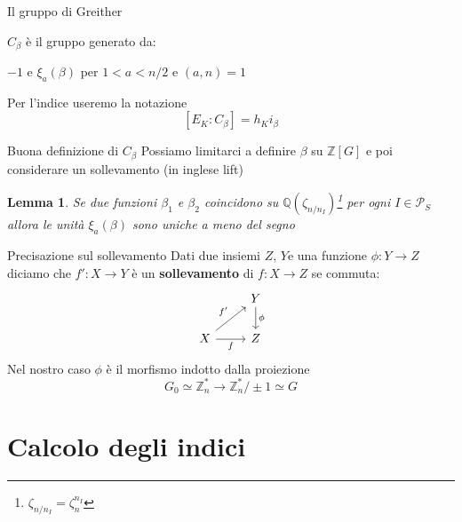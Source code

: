 \documentclass{beamer}
\theoremstyle{plain}
\newtheorem{lem}[teo]{Lemma}
\theoremstyle{remark}
\theoremstyle{definition}
\newcommand{\PS}{\mathcal{P}_S}
\newcommand{\Z}{\mathbb{Z}}
\newcommand{\Q}{\mathbb{Q}}
\begin{document}
	\begin{frame}{Il gruppo di Greither}
		\begin{alertblock}{}
		 		$C_\beta $ è il gruppo generato da:
		 		\begin{center}
		 		
		 		 $ {-1} $ e $ \xi_a (\beta) $ per $ 1< a< n/2 $ e $ (a,n)=1 $
		 		\end{center}
	 	\end{alertblock}
	 	\pause
	 	Per l'indice useremo la notazione $$ [E_K : C_\beta] = h_K i_\beta $$
	\end{frame}
	
	\begin{frame}{Buona definizione di $C_ \beta $}
		Possiamo limitarci a definire $\beta$ su $ \Z[G] $ e poi considerare un sollevamento (in inglese lift)\\
		\pause
		\begin{lem}
			Se due funzioni $ \beta_1 $ e $ \beta_2 $ coincidono su $ \Q(\zeta_{n/n_I} )$\footnote{$ \zeta_{n/n_I} = \zeta_n^{n_I} $} per ogni $ I \in \PS $ allora le unità $ \xi_a (\beta) $ sono uniche a meno del segno
		\end{lem}
	\end{frame}
	
	\begin{frame}[fragile]{Precisazione sul sollevamento}
		Dati due insiemi $ Z, \, Y $e una funzione $ \phi : Y \to Z $ diciamo che $ f' : X \to Y $ è un \textbf{sollevamento} di $ f : X \to Z $ se commuta: 
			\[\begin{tikzcd}
			 & {Y} \arrow[d, " \phi"] \\
			{X} \arrow[r, "f"'] \arrow[ru, "f'"] & {Z}               
			\end{tikzcd}\]
			\pause
			Nel nostro caso $\phi$ è il morfismo indotto dalla proiezione 
			$$G_0 \simeq  \Z_n^\ast  \to  \Z_n^\ast / \pm 1  \simeq G$$
	\end{frame}
	
\section{Calcolo degli indici}
\end{document}
